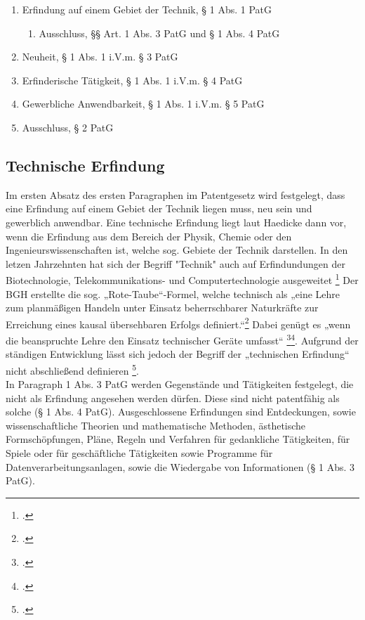 \begin{enumerate}
    \item Erfindung auf einem Gebiet der Technik, § 1 Abs. 1 PatG
    \begin{enumerate}
    \vspace{-0.05in}
    \item Ausschluss, §§ Art. 1 Abs. 3 PatG und § 1 Abs. 4 PatG
    \end{enumerate}
    \vspace{-0.11in} 
    \item Neuheit, § 1 Abs. 1 i.V.m. § 3 PatG
    \vspace{-0.11in} 
    \item Erfinderische Tätigkeit, § 1 Abs. 1 i.V.m. § 4 PatG
    \vspace{-0.11in} 
    \item Gewerbliche Anwendbarkeit, § 1 Abs. 1 i.V.m. § 5 PatG
    \vspace{-0.11in} 
    \item Ausschluss, § 2 PatG
\end{enumerate}

\subsection{Technische Erfindung \label{sec:tecer}}

Im ersten Absatz des ersten Paragraphen im Patentgesetz wird festgelegt,
dass eine Erfindung auf einem Gebiet der Technik liegen muss, neu sein und
gewerblich anwendbar.
Eine technische Erfindung liegt laut Haedicke dann vor, 
wenn die Erfindung aus dem Bereich der Physik, 
Chemie oder den Ingenieurswissenschaften ist, 
welche sog. Gebiete der Technik darstellen.
In den letzen Jahrzehnten hat sich der Begriff 
"Technik" auch auf Erfindundungen der Biotechnologie, 
Telekommunikations- und Computertechnologie ausgeweitet 
\footcite{haedickeEinfuhrung2020}
Der \gls{BGH} erstellte die
sog. „Rote-Taube“-Formel, welche technisch als  
„eine Lehre zum planmäßigen Handeln 
unter Einsatz beherrschbarer Naturkräfte zur Erreichung eines 
kausal übersehbaren Erfolgs definiert.“\footcite{BGH27031969}  
Dabei genügt es „wenn die beanspruchte Lehre den Einsatz technischer Geräte umfasst“
\footcite{BGH3020152015}\footcite{BGH2420112011}. 
Aufgrund der ständigen Entwicklung lässt sich 
jedoch der Begriff der „technischen Erfindung“ 
nicht abschließend definieren \footcite{haedickeEinfuhrung2020}.
\\
In Paragraph 1 Abs. 3 PatG werden Gegenstände und Tätigkeiten festgelegt, 
die nicht als Erfindung angesehen werden dürfen. 
Diese sind nicht patentfähig als solche (§ 1 Abs. 4 PatG). 
Ausgeschlossene Erfindungen sind Entdeckungen, 
sowie wissenschaftliche Theorien und mathematische Methoden, 
ästhetische Formschöpfungen, Pläne, Regeln und Verfahren für gedankliche Tätigkeiten, 
für Spiele 
oder für geschäftliche Tätigkeiten sowie Programme für Datenverarbeitungsanlagen, 
sowie die Wiedergabe von Informationen (§ 1 Abs. 3 PatG). 
\\

